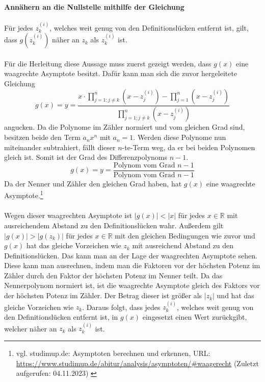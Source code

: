 \documentclass[12pt]{article}
\begin{document}
\paragraph{Annähern an die Nullstelle mithilfe der Gleichung}
Für jedes $z_k^{(i)}$, welches weit genug von den Definitionslücken entfernt ist, gilt, dass $g(z_k^{(i)})$ näher an $z_k$ als $z_k^{(i)}$ ist.\\\\
Für die Herleitung diese Aussage muss zuerst gezeigt werden, dass $g(x)$ eine waagrechte Asymptote besitzt. Dafür kann man sich die zuvor hergeleitete Gleichung
\begin{equation*}
    g(x) = y = \frac{x \cdot \prod_{j=1;j\neq k}^{n} (x-z_j^{(i)}) - \prod_{j=1}^{n} (x-z_j^{(i)})}{\prod_{j=1;j\neq k}^{n} (x-z_j^{(i)})}
\end{equation*}
angucken. Da die Polynome im Zähler normiert und vom gleichen Grad sind, besitzen beide den Term $a_nx^n$ mit $a_n = 1$. Werden diese Polynome nun miteinander subtrahiert, fällt dieser $n$-te-Term weg, da er bei beiden Polynomen gleich ist. Somit ist der Grad des Differenzpolynoms $n-1$. \\
\begin{equation*}
    g(x) = y = \frac{\text{Polynom vom Grad }n-1}{\text{Polynom vom Grad }n-1}
\end{equation*}
Da der Nenner und Zähler den gleichen Grad haben, hat $g(x)$ eine waagrechte Asymptote.\footnote{
    vgl. studimup.de: Asymptoten berechnen und erkennen, URL: \url{https://www.studimup.de/abitur/analysis/asymptoten/#waagerecht} (Zuletzt aufgerufen: 04.11.2023) \label{ftn:studimup.de}
}\\\\
Wegen dieser waagrechten Asymptote ist $|g(x)|<|x|$ für jedes $x \in \mathbb{R}$ mit ausreichendem Abstand zu den Definitionslücken wahr. Außerdem gilt $|g(x)|>|g(z_k)|$ für jedes $x \in \mathbb{R}$ mit den gleichen Bedingungen wie zuvor und $g(x)$ hat das gleiche Vorzeichen wie $z_k$ mit ausreichend Abstand zu den Definitionslücken.
Das kann man an der Lage der waagrechten Asymptote sehen. Diese kann man ausrechnen, indem man die Faktoren vor der höchsten Potenz im Zähler durch den Faktor der höchsten Potenz im Nenner teilt. Da das Nennerpolynom normiert ist, ist die waagrechte Asymptote gleich des Faktors vor der höchsten Potenz im Zähler. Der Betrag dieser ist größer als $|z_k|$ und hat das gleiche Vorzeichen wie $z_k$.
Daraus folgt, dass jedes $z_k^{(i)}$, welches weit genug von den Definitionslücken entfernt ist, in $g(x)$ eingesetzt einen Wert zurückgibt, welcher näher an $z_k$ als $z_k^{(i)}$ ist.
\end{document}
